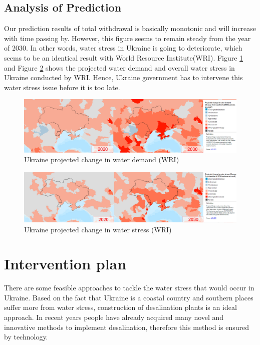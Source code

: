 \subsection{Analysis of Prediction}
Our prediction results of total withdrawal is basically monotonic and will increase with time passing by. However, this figure seems to remain steady from the year of 2030. In other words, water stress in Ukraine is going to deteriorate, which seems to be an identical result with World Resource Institute(WRI)\cite{wri}. Figure \ref{demand} and Figure \ref{waterstress} shows the projected water demand and overall water stress in Ukraine conducted by WRI. Hence, Ukraine government has to intervene this water stress issue before it is too late.
\begin{figure}[hp]
\small
\centering
\includegraphics[width=14cm]{./picture/demand.eps}
\caption{Ukraine projected change in water demand (WRI)} \label{demand}
\end{figure}
\begin{figure}[hp]
\small
\centering
\includegraphics[width=14cm]{./picture/yuce.eps}
\caption{Ukraine projected change in water stress (WRI)} \label{waterstress}
\end{figure}

\section{Intervention plan}
There are some feasible approaches to tackle the water stress that would occur in Ukraine. Based on the fact that Ukraine is a coastal country and southern places suffer more from water stress, construction of desalination plants is an ideal approach. In recent years people have already acquired many novel and innovative methods to implement desalination, therefore this method is ensured by technology.
